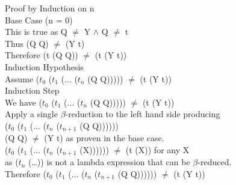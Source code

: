 \documentclass{jhwhw}
\begin{document}
	\bigbreak
	\setlength\parindent{0pt}
	Proof by Induction on n \\
	\setlength\parindent{24pt}
		Base Case (n = 0) \\
		\setlength\parindent{48pt}
		This is true as Q $\neq$ Y $\wedge$ Q $\neq$ t \\
		Thus (Q Q) $\neq$ (Y t) \\
		Therefore (t (Q Q)) $\neq $ (t (Y t)) \\
		\setlength\parindent{24pt}
		Induction Hypothesis \\
		\setlength\parindent{48pt}
		Assume ($t_0$ ($t_1$ ($\ldots$ ($t_n$ (Q Q))))) $\neq$ (t (Y t)) \\
		\setlength\parindent{24pt}
		Induction Step \\
		\setlength\parindent{48pt}
		We have ($t_0$ ($t_1$ ($\ldots$ ($t_n$ (Q Q))))) $\neq$ (t (Y t)) \\
		Apply a single $\beta$-reduction to the left hand side producing \\
		($t_0$ ($t_1$ ($\ldots$ ($t_n$ ($t_{n+1}$ (Q Q)))))) \\
		(Q Q) $\neq$ (Y t) as proven in the base case. \\
		($t_0$ ($t_1$ ($\ldots$ ($t_n$ ($t_{n+1}$ (X)))))) $\neq$ (t (X)) for any X \\
		as ($t_n$ (\ldots)) is not a lambda expression that can be $\beta$-reduced. \\
		Therefore ($t_0$ ($t_1$ ($\ldots$ ($t_n$ ($t_{n+1}$ (Q Q)))))) $\neq$ (t (Y t)) \square\\
\end{document}
